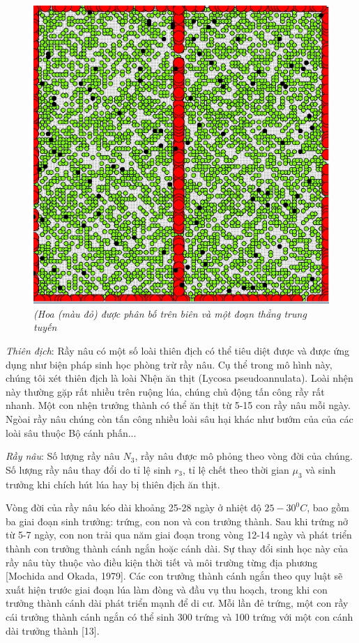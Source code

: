 \documentclass[13pt]{extreport}
\begin{document}
\begin{figure}
\begin{center}
\includegraphics[scale=0.4]{kb3}
\end{center}
\caption{\textit{(Hoa (màu đỏ) được phân bố trên biên và một đoạn thẳng trung tuyến}}
\end{figure}

\textit{Thiên địch}: Rầy nâu có một số loài  thiên địch có thể tiêu diệt được và được
ứng dụng như biện pháp sinh học phòng trừ rầy nâu. Cụ thể trong mô hình này, chúng tôi xét thiên địch là loài Nhện ăn thịt (Lycosa  pseudoannulata). Loài nhện này thường gặp rất 
nhiều trên ruộng lúa, chúng chủ động tấn công rầy rất nhanh. Một 
con nhện trưởng thành có thể ăn thịt từ 5-15 con rầy nâu mỗi 
ngày. Ngòai rầy nâu chúng còn tấn công nhiều loài sâu hại khác 
như  bướm của của các loài sâu thuộc Bộ cánh phấn...

\textit{Rầy nâu}: Số lượng rầy nâu $N_3$, rầy nâu được mô phỏng theo vòng đời của chúng. Số lượng rầy nâu thay đổi do tỉ lệ sinh  $r_3$, tỉ lệ chết theo thời gian  $\mu_3$ và sinh trưởng khi chích hút lúa hay bị thiên địch ăn thịt.

Vòng đời của rầy nâu kéo dài khoảng 25-28 ngày ở nhiệt độ $25-30^0C$, bao gồm ba giai đoạn sinh trưởng: trứng, con non và con trưởng thành. Sau khi trứng nở từ 5-7 ngày, con non trải qua năm giai đoạn trong vòng 12-14 ngày và phát triển thành con trưởng thành cánh ngắn hoặc cánh dài. Sự thay đổi sinh học này của rầy nâu tùy thuộc vào điều kiện thời tiết và môi trường từng địa phương [Mochida and Okada, 1979]. Các con trưởng thành cánh ngắn theo quy luật sẽ xuất hiện trước giai đoạn lúa làm đòng và đầu vụ thu hoạch, trong khi con trưởng thành cánh dài phát triển mạnh để di cư. Mỗi lần đẻ trứng, một con rầy cái trưởng thành cánh ngắn có thể sinh 300 trứng và 100 trứng với một con cánh dài trưởng thành [13].
\end{document}
